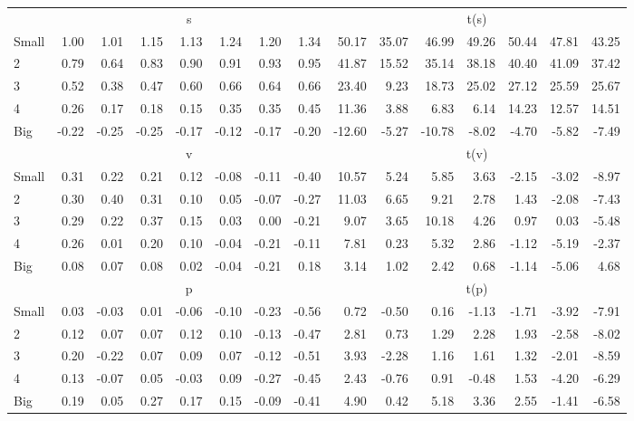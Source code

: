 \begin{table}[!ht]
\begin{tabular}{lrrrrrrrrrrrrrr}
  
     & \multicolumn{7}{c}{s} & \multicolumn{7}{c}{t(s)}   \\
     \cmidrule(r){2-8} \cmidrule(r){9-15} 
    Small  & 1.00  & 1.01  & 1.15  & 1.13  & 1.24  & 1.20  & 1.34  & 50.17  & 35.07  & 46.99  & 49.26  & 50.44  & 47.81  & 43.25   \\
    2  & 0.79  & 0.64  & 0.83  & 0.90  & 0.91  & 0.93  & 0.95  & 41.87  & 15.52  & 35.14  & 38.18  & 40.40  & 41.09  & 37.42   \\
    3  & 0.52  & 0.38  & 0.47  & 0.60  & 0.66  & 0.64  & 0.66  & 23.40  & 9.23  & 18.73  & 25.02  & 27.12  & 25.59  & 25.67   \\
    4  & 0.26  & 0.17  & 0.18  & 0.15  & 0.35  & 0.35  & 0.45  & 11.36  & 3.88  & 6.83  & 6.14  & 14.23  & 12.57  & 14.51   \\
    Big  & -0.22  & -0.25  & -0.25  & -0.17  & -0.12  & -0.17  & -0.20  & -12.60  & -5.27  & -10.78  & -8.02  & -4.70  & -5.82  & -7.49   \\
    
  
     & \multicolumn{7}{c}{v} & \multicolumn{7}{c}{t(v)}   \\
     \cmidrule(r){2-8} \cmidrule(r){9-15} 
    Small  & 0.31  & 0.22  & 0.21  & 0.12  & -0.08  & -0.11  & -0.40  & 10.57  & 5.24  & 5.85  & 3.63  & -2.15  & -3.02  & -8.97   \\
    2  & 0.30  & 0.40  & 0.31  & 0.10  & 0.05  & -0.07  & -0.27  & 11.03  & 6.65  & 9.21  & 2.78  & 1.43  & -2.08  & -7.43   \\
    3  & 0.29  & 0.22  & 0.37  & 0.15  & 0.03  & 0.00  & -0.21  & 9.07  & 3.65  & 10.18  & 4.26  & 0.97  & 0.03  & -5.48   \\
    4  & 0.26  & 0.01  & 0.20  & 0.10  & -0.04  & -0.21  & -0.11  & 7.81  & 0.23  & 5.32  & 2.86  & -1.12  & -5.19  & -2.37   \\
    Big  & 0.08  & 0.07  & 0.08  & 0.02  & -0.04  & -0.21  & 0.18  & 3.14  & 1.02  & 2.42  & 0.68  & -1.14  & -5.06  & 4.68   \\
    
  
     & \multicolumn{7}{c}{p} & \multicolumn{7}{c}{t(p)}   \\
     \cmidrule(r){2-8} \cmidrule(r){9-15} 
    Small  & 0.03  & -0.03  & 0.01  & -0.06  & -0.10  & -0.23  & -0.56  & 0.72  & -0.50  & 0.16  & -1.13  & -1.71  & -3.92  & -7.91   \\
    2  & 0.12  & 0.07  & 0.07  & 0.12  & 0.10  & -0.13  & -0.47  & 2.81  & 0.73  & 1.29  & 2.28  & 1.93  & -2.58  & -8.02   \\
    3  & 0.20  & -0.22  & 0.07  & 0.09  & 0.07  & -0.12  & -0.51  & 3.93  & -2.28  & 1.16  & 1.61  & 1.32  & -2.01  & -8.59   \\
    4  & 0.13  & -0.07  & 0.05  & -0.03  & 0.09  & -0.27  & -0.45  & 2.43  & -0.76  & 0.91  & -0.48  & 1.53  & -4.20  & -6.29   \\
    Big  & 0.19  & 0.05  & 0.27  & 0.17  & 0.15  & -0.09  & -0.41  & 4.90  & 0.42  & 5.18  & 3.36  & 2.55  & -1.41  & -6.58   \\
    

\end{tabular}
\end{table}
